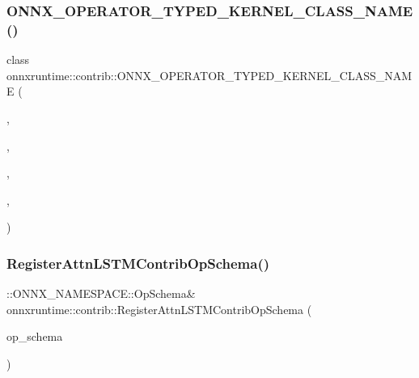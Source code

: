 \subsubsection{\texorpdfstring{O\+N\+N\+X\+\_\+\+O\+P\+E\+R\+A\+T\+O\+R\+\_\+\+T\+Y\+P\+E\+D\+\_\+\+K\+E\+R\+N\+E\+L\+\_\+\+C\+L\+A\+S\+S\+\_\+\+N\+A\+M\+E()}{ONNX\_OPERATOR\_TYPED\_KERNEL\_CLASS\_NAME()}\hspace{0.1cm}{\footnotesize\ttfamily [3/3]}}
{\footnotesize\ttfamily class onnxruntime\+::contrib\+::\+O\+N\+N\+X\+\_\+\+O\+P\+E\+R\+A\+T\+O\+R\+\_\+\+T\+Y\+P\+E\+D\+\_\+\+K\+E\+R\+N\+E\+L\+\_\+\+C\+L\+A\+S\+S\+\_\+\+N\+A\+ME (\begin{DoxyParamCaption}\item[{\mbox{\hyperlink{namespaceonnxruntime_a394a3c7e50622de1f203a96df592060d}{k\+Cpu\+Execution\+Provider}}}]{,  }\item[{\mbox{\hyperlink{namespaceonnxruntime_a1e63b08774e23395d961e8e35fb62db1}{k\+M\+S\+Domain}}}]{,  }\item[{1}]{,  }\item[{float}]{,  }\item[{\mbox{\hyperlink{classonnxruntime_1_1contrib_1_1IsNaN}{Is\+NaN}}}]{ }\end{DoxyParamCaption})}

\mbox{\label{namespaceonnxruntime_1_1contrib_ab7b2c79feb8ae6d92ec8f8decb006d11}} 
\subsubsection{\texorpdfstring{Register\+Attn\+L\+S\+T\+M\+Contrib\+Op\+Schema()}{RegisterAttnLSTMContribOpSchema()}\hspace{0.1cm}{\footnotesize\ttfamily [1/2]}}
{\footnotesize\ttfamily \+::O\+N\+N\+X\+\_\+\+N\+A\+M\+E\+S\+P\+A\+C\+E\+::\+Op\+Schema\& onnxruntime\+::contrib\+::\+Register\+Attn\+L\+S\+T\+M\+Contrib\+Op\+Schema (\begin{DoxyParamCaption}\item[{\+::O\+N\+N\+X\+\_\+\+N\+A\+M\+E\+S\+P\+A\+C\+E\+::\+Op\+Schema \&\&}]{op\+\_\+schema }\end{DoxyParamCaption})}

